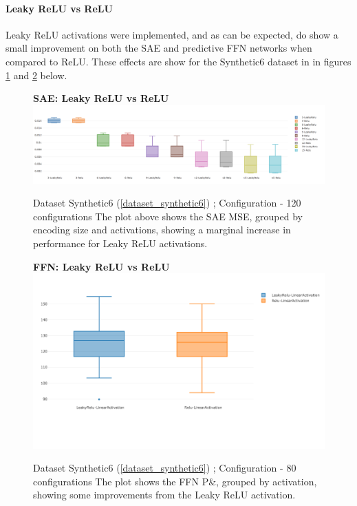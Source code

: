 \documentclass[a4paper,11pt,oneside]{article}
\theoremstyle{plain}
\theoremstyle{definition}
\begin{document}
\paragraph{Leaky ReLU vs ReLU}

Leaky ReLU activations were implemented, and as can be expected, do show a small improvement on both the SAE and predictive FFN networks when compared to ReLU. These effects are show for the Synthetic6 dataset in in figures \ref{figure-results_leaky_relu_1} and \ref{figure-results_leaky_relu_3} below. 

\begin{figure}[H]
	\centering 
	\textbf{SAE: Leaky ReLU vs ReLU} 
	\includegraphics[scale=0.28]{images/results/activation/relu_leaky-relu.png}
	\caption{Dataset Synthetic6  (\ref{dataset_synthetic6}) ; Configuration  - 120 configurations
		\newline \newline The plot above shows the SAE MSE, grouped by encoding size and activations, showing a marginal increase in performance for Leaky ReLU activations. }
	\label{figure-results_leaky_relu_1}
\end{figure}

\begin{figure}[H]
	\textbf{FFN: Leaky ReLU vs ReLU}
	\centering
	\includegraphics[scale=0.35]{images/iteration_three/it3_leaky_relu_3.png}
	\caption{Dataset Synthetic6  (\ref{dataset_synthetic6}) ; Configuration - 80 configurations
		\newline \newline The plot shows the FFN P\&, grouped by activation, showing some improvements from the Leaky ReLU activation.}
	\label{figure-results_leaky_relu_3}
\end{figure}
\end{document}
